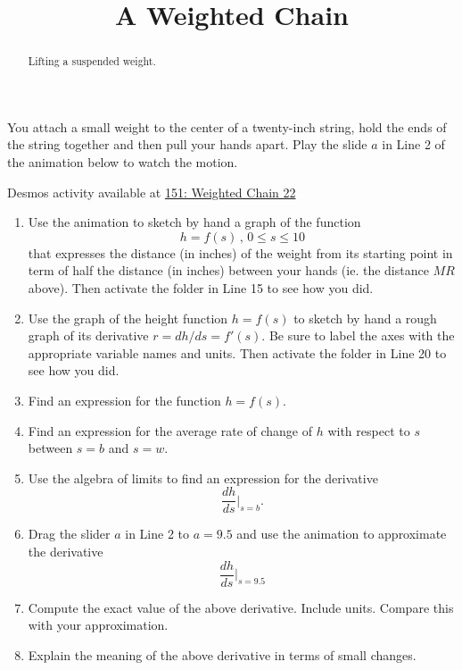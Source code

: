 \documentclass{ximera}
\title{A Weighted Chain}
\begin{document}
\begin{abstract}
Lifting a suspended weight.
\end{abstract}
\maketitle


\begin{question}  \label{Q:LMMN89}
You attach a small weight to the center of a twenty-inch string, hold the ends of the string together and then pull your hands apart. Play the slide $a$ in Line 2 of the animation below to watch the motion. 
\begin{onlineOnly}
    \begin{center}
\end{center}
\end{onlineOnly}

Desmos activity available at \href{https://www.desmos.com/calculator/jmqscra2if}{151: Weighted Chain 22} 

\begin{enumerate}
\item Use the animation to sketch by hand a graph of the function
\[
 h = f(s) \, , \, 0\leq s \leq 10
\]
that expresses the distance (in inches) of the weight from its starting point in term of half the distance (in inches) between your hands (ie. the distance $MR$ above). Then activate the folder in Line 15 to see how you did.

\item Use the graph of the height function $h=f(s)$ to sketch by hand a rough graph of its derivative $r = dh/ds = f'(s)$. Be sure to label the axes with the appropriate variable names and units. Then activate the folder in Line 20 to see how you did.

\item Find an expression for the function $h=f(s)$.

\item Find an expression for the average rate of change of $h$ with respect to $s$ between $s=b$ and $s=w$.

\item Use the algebra of limits to find an expression for the derivative
\[
   \frac{dh}{ds}\Big|_{s=b} .
\]

\item Drag the slider $a$ in Line 2 to $a=9.5$ and use the animation to approximate the derivative
\[
  \frac{dh}{ds}\Big|_{s=9.5}
\]

\item Compute the exact value of the above derivative. Include units. Compare this with your approximation.

\item Explain the meaning of the above derivative in terms of small changes.


\end{enumerate}


\end{question}
\end{document}
